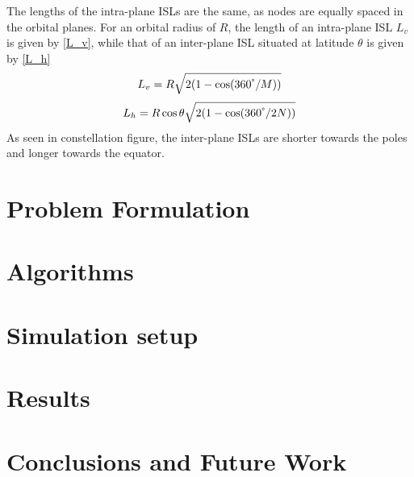 \documentclass[10pt,conference, draft, letterpaper]{IEEEtran}
\newcommand{\rough}[1]{{\color{red} #1}}
\begin{document}
The lengths of the intra-plane ISLs are the same, as nodes are equally spaced in the orbital planes. For an orbital radius of $R$, the length of an intra-plane ISL $L_v$ is given by \ref{L_v}, while that of an inter-plane ISL situated at latitude $\theta$ is given by \ref{L_h}
\begin{equation}
\label{L_v}
	L_v = R\sqrt{2(1-\cos(360^\degree/M))}
\end{equation}
\begin{equation}
	\label{L_h}
	L_h = R\cos{\theta}\sqrt{2(1-\cos(360^\degree/2N))}
\end{equation}
As seen in \rough{constellation figure}, the inter-plane ISLs are shorter towards the poles and longer towards the equator.
\section{Problem Formulation}
\section{Algorithms}
\section{Simulation setup}
\section{Results}
\section{Conclusions and Future Work}


\end{document}
